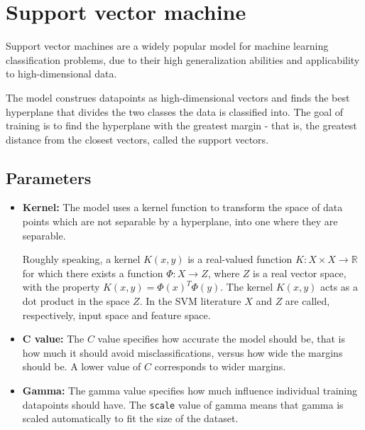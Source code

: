 \section{Support vector machine}
Support vector machines \cite{support_vector_machine} are a widely popular model for machine learning classification problems, due to their high generalization abilities and applicability to high-dimensional data.

The model construes datapoints as high-dimensional vectors and finds the best hyperplane that divides the two classes the data is classified into. The goal of training is to find the hyperplane with the greatest margin - that is, the greatest distance from the closest vectors, called the support vectors.

\subsection{Parameters}
\begin{itemize}
	\item \textbf{Kernel:} The model uses a kernel function to transform the space of data points which are not separable by a hyperplane, into one where they are separable.

	      Roughly speaking, a kernel \( K(x, y) \) is a real-valued
	      function \( K : X \times X \rightarrow \mathbb{R} \) for which there exists a
	      function \( \Phi : X \rightarrow Z \), where \( Z \) is a real vector space,
	      with the property \( K(x, y) = \Phi(x)^T \Phi(y) \). The
	      kernel \( K(x, y) \) acts as a dot product in the space \( Z \).
	      In the SVM literature \( X \) and \( Z \) are called, respectively, input space and feature space. \cite{support_vector_machine} %

	\item \textbf{C value:} The \(C\) value specifies how accurate the model should be, that is how much it should avoid misclassifications, versus how wide the margins should be. A lower value of \(C\) corresponds to wider margins.

	\item \textbf{Gamma:} The gamma value specifies how much influence individual training datapoints should have. The \verb|scale| value of gamma means that gamma is scaled automatically to fit the size of the dataset.
\end{itemize}

